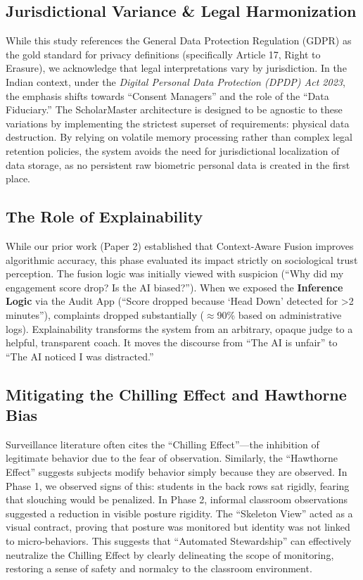 \documentclass[conference]{IEEEtran}
\begin{document}
\subsection{Jurisdictional Variance \& Legal Harmonization}
While this study references the General Data Protection Regulation (GDPR) \cite{b26} as the gold standard for privacy definitions (specifically Article 17, Right to Erasure), we acknowledge that legal interpretations vary by jurisdiction. In the Indian context, under the \textit{Digital Personal Data Protection (DPDP) Act 2023}, the emphasis shifts towards ``Consent Managers'' and the role of the ``Data Fiduciary.'' The ScholarMaster architecture is designed to be agnostic to these variations by implementing the strictest superset of requirements: physical data destruction. By relying on volatile memory processing rather than complex legal retention policies, the system avoids the need for jurisdictional localization of data storage, as no persistent raw biometric personal data is created in the first place.

\subsection{The Role of Explainability}
While our prior work (Paper 2) established that Context-Aware Fusion improves algorithmic accuracy, this phase evaluated its impact strictly on sociological trust perception. The fusion logic was initially viewed with suspicion (``Why did my engagement score drop? Is the AI biased?''). When we exposed the \textbf{Inference Logic} via the Audit App (``Score dropped because `Head Down' detected for >2 minutes''), complaints dropped substantially ($\approx$90\% based on administrative logs). Explainability transforms the system from an arbitrary, opaque judge to a helpful, transparent coach. It moves the discourse from ``The AI is unfair'' to ``The AI noticed I was distracted.''

\subsection{Mitigating the Chilling Effect and Hawthorne Bias}
Surveillance literature often cites the ``Chilling Effect''---the inhibition of legitimate behavior due to the fear of observation. Similarly, the ``Hawthorne Effect'' suggests subjects modify behavior simply because they are observed. In Phase 1, we observed signs of this: students in the back rows sat rigidly, fearing that slouching would be penalized. In Phase 2, informal classroom observations suggested a reduction in visible posture rigidity. The ``Skeleton View'' acted as a visual contract, proving that posture was monitored but identity was not linked to micro-behaviors. This suggests that ``Automated Stewardship'' can effectively neutralize the Chilling Effect by clearly delineating the scope of monitoring, restoring a sense of safety and normalcy to the classroom environment.
\end{document}
